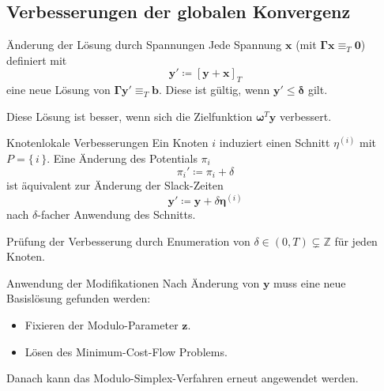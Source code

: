 \documentclass[accentcolor = tud11b, colorbacktitle, landscape, german, presentation, tudmathserif]{tudbeamer}
\newcommand{\Z}{\ensuremath{\mathbb{Z}}}
\newcommand{\mat}[1]{\boldsymbol{\mathbf{#1}}}
\renewcommand{\vec}[1]{\boldsymbol{\mathbf{#1}}}
\begin{document}
		\subsection{Verbesserungen der globalen Konvergenz}
			\begin{frame}{Änderung der Lösung durch Spannungen}
				Jede Spannung \( \vec{x} \) (mit \( \mat{\Gamma} \vec{x} \equiv_T \vec{0} \)) definiert mit
				\begin{equation*}
					\vec{y}' \coloneqq [\vec{y} + \vec{x}]_T
				\end{equation*}
				eine neue Lösung von \( \mat{\Gamma} \vec{y}' \equiv_T \vec{b} \). Diese ist gültig, wenn \( \vec{y}' \leq \vec{\delta} \) gilt.
				
				\vspace{0.5cm}
				Diese Lösung ist besser, wenn sich die Zielfunktion \( \vec{\omega}^T \vec{y} \) verbessert.
			\end{frame}
		
			\begin{frame}{Knotenlokale Verbesserungen}
				Ein Knoten \(i\) induziert einen Schnitt \( \eta^{(i)} \) mit \( P = \{\, i \,\} \). Eine Änderung des Potentials \( \pi_i \)
				\begin{equation*}
					\pi_i' \coloneqq \pi_i + \delta
				\end{equation*}
				ist äquivalent zur Änderung der Slack-Zeiten
				\begin{equation*}
					\vec{y}' \coloneqq \vec{y} + \delta\vec{\eta}^{(i)}
				\end{equation*}
				nach \(\delta\)-facher Anwendung des Schnitts.
				
				Prüfung der Verbesserung durch Enumeration von \( \delta \in (0, T) \subsetneq \Z \) für jeden Knoten.
			\end{frame}
		
			\begin{frame}{Anwendung der Modifikationen}
				Nach Änderung von \(\vec{y}\) muss eine neue Basislösung gefunden werden:
				\begin{itemize}
					\item Fixieren der Modulo-Parameter \(\vec{z}\).
					\item Lösen des Minimum-Cost-Flow Problems.
				\end{itemize}
				Danach kann das Modulo-Simplex-Verfahren erneut angewendet werden.
			\end{frame}
	
\end{document}
